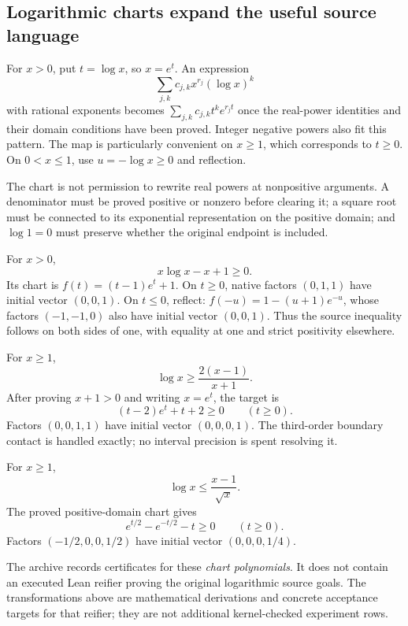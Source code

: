 \subsection{Logarithmic charts expand the useful source language}

For $x>0$, put $t=\log x$, so $x=e^t$. An expression
\[
 \sum_{j,k}c_{j,k}x^{r_j}(\log x)^k
\]
with rational exponents becomes
$\sum_{j,k}c_{j,k}t^ke^{r_jt}$ once the real-power identities and their domain
conditions have been proved. Integer negative powers also fit this pattern.
The map is particularly convenient on $x\ge1$, which corresponds to $t\ge0$.
On $0<x\le1$, use $u=-\log x\ge0$ and reflection.

The chart is not permission to rewrite real powers at nonpositive arguments.
A denominator must be proved positive or nonzero before clearing it; a square
root must be connected to its exponential representation on the positive
domain; and $\log1=0$ must preserve whether the original endpoint is included.

\begin{example}
For $x>0$,
\[
 x\log x-x+1\ge0.
\]
Its chart is $f(t)=(t-1)e^t+1$. On $t\ge0$, native factors $(0,1,1)$ have
initial vector $(0,0,1)$. On $t\le0$, reflect: $f(-u)=1-(u+1)e^{-u}$,
whose factors $(-1,-1,0)$ also have initial vector $(0,0,1)$.
Thus the source inequality follows on both sides of one, with equality at one
and strict positivity elsewhere.
\end{example}

\begin{example}
For $x\ge1$,
\[
 \log x\ge\frac{2(x-1)}{x+1}.
\]
After proving $x+1>0$ and writing $x=e^t$, the target is
\[
 (t-2)e^t+t+2\ge0\qquad(t\ge0).
\]
Factors $(0,0,1,1)$ have initial vector $(0,0,0,1)$. The third-order boundary
contact is handled exactly; no interval precision is spent resolving it.
\end{example}

\begin{example}
For $x\ge1$,
\[
 \log x\le\frac{x-1}{\sqrt x}.
\]
The proved positive-domain chart gives
\[
 e^{t/2}-e^{-t/2}-t\ge0\qquad(t\ge0).
\]
Factors $(-1/2,0,0,1/2)$ have initial vector $(0,0,0,1/4)$.
\end{example}

The archive records certificates for these \emph{chart polynomials}. It does
not contain an executed Lean reifier proving the original logarithmic source
goals. The transformations above are mathematical derivations and concrete
acceptance targets for that reifier; they are not additional kernel-checked
experiment rows.

